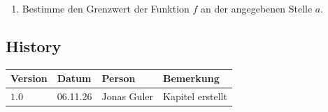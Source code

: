 \documentclass[11pt,oneside]{article}
\begin{document}
\begin{aufgabe}
\begin{enumerate}
			\item Bestimme den Grenzwert der Funktion $f$ an der angegebenen Stelle $a$.
		\end{enumerate}
	\end{aufgabe}

\newpage
\subsection*{History}
\begin{table}[H]
	\centering
	\begin{tabular}{|p{13mm}|p{20mm}|p{30mm}|p{70mm}|}\hline
		Version & Datum & Person & Bemerkung \\\hline
		$1.0$ & 06.11.26 & Jonas Guler & Kapitel erstellt \\\hline
	\end{tabular}
\end{table}
\end{document}

